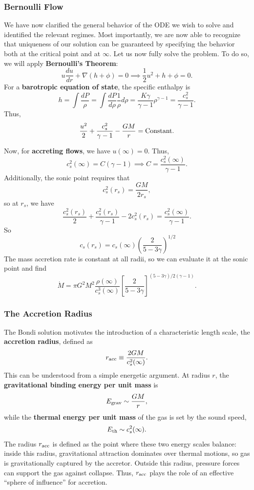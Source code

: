 \subsubsection{Bernoulli Flow}
We have now clarified the general behavior of the ODE we wish to solve and identified the relevant regimes. Most importantly, we are now able to recognize that uniqueness of our solution can be guaranteed by specifying the behavior both at the critical point and at $\infty$. Let us now fully solve the problem. To do so, we will apply \textbf{Bernoulli's Theorem}:
\[
u \frac{du}{dr}+ \nabla(h+\phi) = 0 \implies \frac{1}{2} u^2 + h + \phi = 0.
\]
For a \textbf{barotropic equation of state}, the specific enthalpy is
\[
h = \int \frac{dP}{\rho} = \int \frac{dP}{d\rho} \frac{1}{\rho} d\rho = \frac{K\gamma}{\gamma -1} \rho^{\gamma - 1} = \frac{c_s^2}{\gamma -1}.
\]
Thus,
\begin{equation}
    \frac{u^2}{2} + \frac{c_s^2}{\gamma -1} - \frac{GM}{r} = \rm{Constant}.
\end{equation}
\par
Now, for \textbf{accreting flows}, we have $u(\infty) = 0$. Thus,
\[
c_s^2(\infty) = C(\gamma-1) \implies C = \frac{c_s^2(\infty)}{\gamma -1}.
\]
Additionally, the sonic point requires that
\[
c_s^2(r_s) = \frac{GM}{2r_s},
\]
so at $r_s$, we have
\[
\frac{c_s^2(r_s)}{2} + \frac{c_s^2(r_s)}{\gamma -1} - 2c_s^2(r_s) = \frac{c_s^2(\infty)}{\gamma -1}.
\]
So
\begin{equation}
\boxed{\
    c_s(r_s) = c_s(\infty) \left(\frac{2}{5 - 3\gamma}\right)^{1/2}
    }
\end{equation}
The mass accretion rate is constant at all radii, so we can evaluate it at the sonic point and find
\begin{equation}
    \boxed{
    \dot{M} = \pi G^2 M^2 \frac{\rho(\infty)}{c_s^3(\infty)} \left[\frac{2}{5-3\gamma}\right]^{(5-3\gamma)/2(\gamma-1)}.
    }
\end{equation}
\subsubsection{The Accretion Radius}

The Bondi solution motivates the introduction of a characteristic length scale, the
\textbf{accretion radius}, defined as
\begin{equation}
    \label{eq:bondi_radius}
    r_{\rm acc} \equiv \frac{2GM}{c_s^2(\infty)}.
\end{equation}
This can be understood from a simple energetic argument. At radius $r$, the
\textbf{gravitational binding energy per unit mass} is
\[
E_{\rm grav} \sim \frac{GM}{r},
\]
while the \textbf{thermal energy per unit mass} of the gas is set by the sound speed,
\[
E_{\rm th} \sim c_s^2(\infty).
\]
The radius $r_{\rm acc}$ is defined as the point where these two energy scales balance:
inside this radius, gravitational attraction dominates over thermal motions, so gas is
gravitationally captured by the accretor. Outside this radius, pressure forces can
support the gas against collapse. Thus, $r_{\rm acc}$ plays the role of an effective
``sphere of influence'' for accretion.

